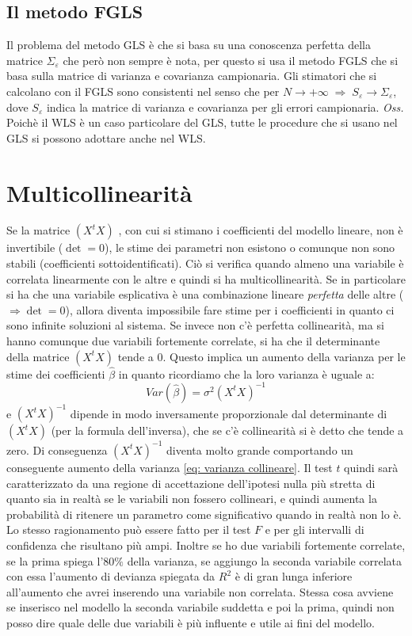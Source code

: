 \subsection{Il metodo FGLS}
Il problema del metodo GLS è che si basa su una conoscenza perfetta della matrice $\Sigma_\varepsilon$ che però non sempre è nota, per questo si usa il metodo FGLS che si basa sulla matrice di varianza e covarianza campionaria. Gli stimatori che si calcolano con il FGLS sono consistenti nel senso che per $N \rightarrow +\infty \; \Rightarrow \; S_\varepsilon \rightarrow \Sigma_\varepsilon$, dove $S_\varepsilon$ indica la matrice di varianza e covarianza per gli errori campionaria.
\textit{Oss.}\\
Poichè il WLS è un caso particolare del GLS, tutte le procedure che si usano nel GLS si possono adottare anche nel WLS. 

\section{Multicollinearità}
Se la matrice $(X^t X)$ , con cui si stimano i coefficienti del modello lineare, non è invertibile ($\det = 0$), le stime dei parametri non esistono o comunque non sono stabili (coefficienti sottoidentificati). Ciò si verifica quando almeno una variabile è correlata linearmente con le altre e quindi si ha multicollinearità. Se in particolare si ha che una variabile esplicativa è una combinazione lineare \textit{perfetta} delle altre ($\Rightarrow \det = 0$), allora diventa impossibile fare stime per i coefficienti in quanto ci sono infinite soluzioni al sistema. Se invece non c’è perfetta collinearità, ma si hanno comunque due variabili fortemente correlate, si ha che il determinante della matrice $(X^t X)$ tende a $0$. Questo implica un aumento della varianza per le stime dei coefficienti $\hat{\beta}$ in quanto ricordiamo che la loro varianza è uguale a:
\begin{equation}
	Var(\hat{\beta}) = \sigma^2 (X^t X)^{-1}
	\label{eq: varianza collineare}
\end{equation}
e $(X^t X)^{-1}$ dipende in modo inversamente proporzionale dal determinante di $(X^t X)$ (per la formula dell'inversa), che se c’è collinearità si è detto che tende a zero. Di conseguenza $(X^t X)^{-1}$ diventa molto grande comportando un conseguente aumento della varianza \eqref{eq: varianza collineare}.  Il test $t$ quindi sarà caratterizzato da una regione di accettazione dell’ipotesi nulla più stretta di quanto sia in realtà se le variabili non fossero collineari, e quindi aumenta la probabilità di ritenere un parametro come significativo quando in realtà non lo è. Lo stesso ragionamento può essere fatto per il test $F$ e per gli intervalli di confidenza che risultano più ampi. Inoltre se ho due variabili fortemente correlate, se la prima spiega l’$80\%$ della varianza, se aggiungo la seconda variabile correlata con essa l’aumento di devianza spiegata da $R^2$ è di gran lunga inferiore all’aumento che avrei inserendo una variabile non correlata. Stessa cosa avviene se inserisco nel modello la seconda variabile suddetta e poi la prima, quindi non posso dire quale delle due variabili è più influente e utile ai fini del modello.

